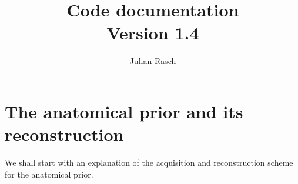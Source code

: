 \documentclass{article}
\newcommand{\TV}{\mathrm{TV}}
\newcommand{\Kcal}{\mathcal{K}}
\begin{document}
\title{Code documentation \\ Version 1.4} 
\author{Julian Rasch}

\maketitle


\section{The anatomical prior and its reconstruction}
We shall start with an explanation of the acquisition and reconstruction scheme for the anatomical prior.
\end{document}
